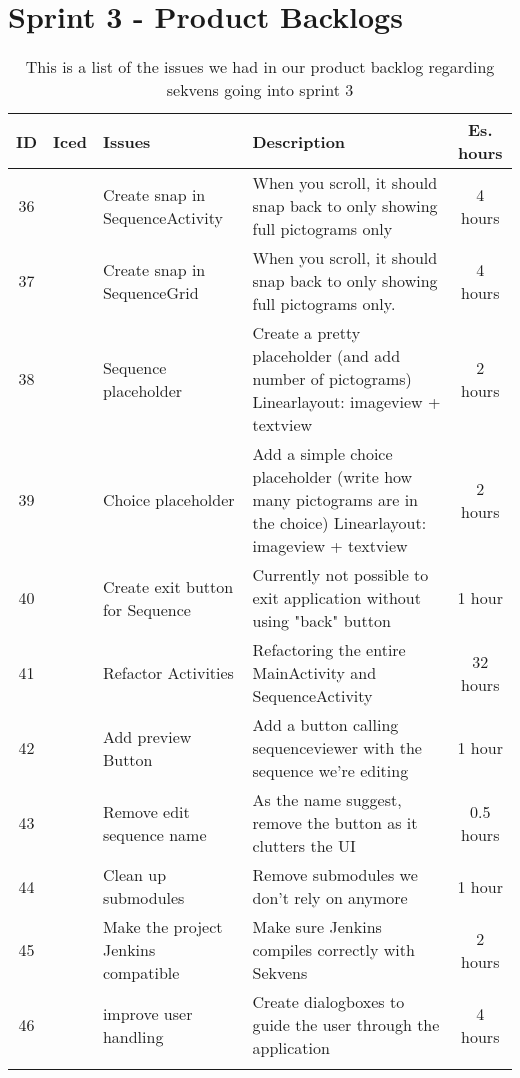 \section{Sprint 3 - Product Backlogs}
\begin{longtable} { | c | c | p{5cm} | p{5cm} | c | } 
\hline
	ID 	&	Iced	&	Issues	&	Description		&	 Es. hours \\\hline
	36	& 	 	&	Create snap in SequenceActivity		& 	When you scroll, it should snap back to only showing full pictograms only	 & 4 hours \\\hline
	37	& 	 	&	Create snap in SequenceGrid		& 	When you scroll, it should snap back to only showing full pictograms only.	 & 4 hours \\\hline
	38	&		 &	Sequence placeholder 	 &		Create a pretty placeholder (and add number of pictograms) Linearlayout: imageview + textview			 &	2 hours\\\hline
	39	&		 &	Choice placeholder		 &		Add a simple choice placeholder (write how many pictograms are in the choice) Linearlayout: imageview + textview			 &	2 hours \\\hline
	40	&		& 	Create exit button for Sequence	 &		Currently not possible to exit application without using "back" button	 &	 1 hour		\\\hline
	41	&		 &	Refactor Activities		 &		Refactoring the entire MainActivity and SequenceActivity	 &	32 hours \\\hline
	42	&		 &	Add preview Button		 &		Add a button calling sequenceviewer with the sequence we're editing		 & 1 hour	\\\hline
	43	&		 &	Remove edit sequence name	 &	As the name suggest, remove the button as it clutters the UI		 &	0.5 hours \\\hline
	44	&		 & 	Clean up submodules  &		Remove submodules we don't rely on anymore	 &	1 hour\\\hline
	45	&		 &	Make the project Jenkins compatible		 &		Make sure Jenkins compiles correctly with Sekvens			 &	2 hours \\\hline
	46	&		 &	improve user handling 		 &		Create dialogboxes to guide the user through the application		 &	4 hours \\\hline
\caption{This is a list of the issues we had in our product backlog regarding sekvens going into sprint 3}
\label{tab:spr3_prodblog}
\end{longtable}

